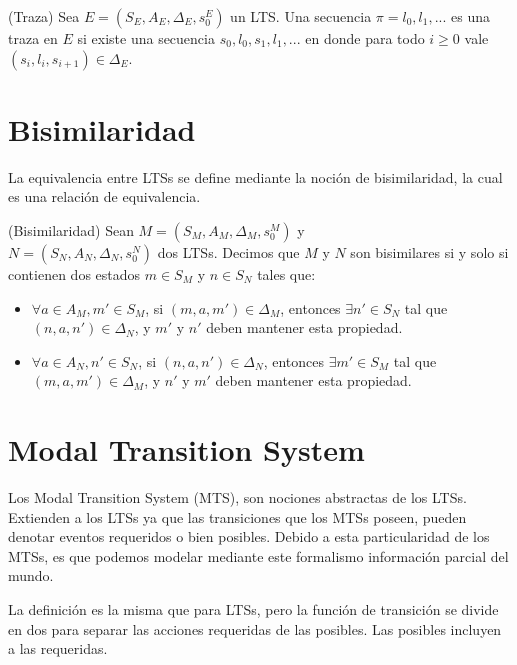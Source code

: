 \begin{definition}{(Traza)}
Sea $E = (S_{E}, A_{E}, \Delta_{E}, s_{0}^{E})$ un LTS. Una secuencia $\pi = l_{0}, l_{1}, ...$ es una traza en $E$ si existe una
secuencia $s_{0}, l_{0}, s_{1}, l_{1}, ...$ en donde para todo $i \geq 0$ vale $(s_{i}, l_{i}, s_{i + 1}) \in \Delta_{E}$.
\end{definition}

\section{Bisimilaridad}
La equivalencia entre LTSs se define mediante la noción de bisimilaridad, la cual es una relación de equivalencia.

\begin{definition}{(Bisimilaridad)}
Sean $M = (S_{M}, A_{M}, \Delta_{M}, s_{0}^{M})$ y\\
$N = (S_{N}, A_{N}, \Delta_{N}, s_{0}^{N})$ dos LTSs. Decimos que $M$ y $N$ son bisimilares si y solo si contienen dos
estados $m \in S_{M}$ y $n \in S_{N}$ tales que:
\begin{itemize}

\item
$\forall a \in A_{M}, m' \in S_{M}$, si $(m, a, m') \in \Delta_{M}$, entonces $\exists n' \in S_{N}$ tal que 
$(n, a, n') \in \Delta_{N}$, y $m'$ y $n'$ deben mantener esta propiedad.

\item
$\forall a \in A_{N}, n' \in S_{N}$, si $(n, a, n') \in \Delta_{N}$, entonces $\exists m' \in S_{M}$ tal que 
$(m, a, m') \in \Delta_{M}$, y $n'$ y $m'$ deben mantener esta propiedad.

\end{itemize}
\end{definition}

\section{Modal Transition System}
Los Modal Transition System \cite{MTS} (MTS), son nociones abstractas de los LTSs. Extienden a los LTSs ya que las transiciones 
que los MTSs poseen, pueden denotar eventos requeridos o bien posibles. Debido a esta particularidad de los MTSs, es 
que podemos modelar mediante este formalismo información parcial del mundo.

\vspace{\baselineskip}
La definición es la misma que para LTSs, pero la función de transición se divide en dos para separar las acciones
requeridas de las posibles. Las posibles incluyen a las requeridas.

